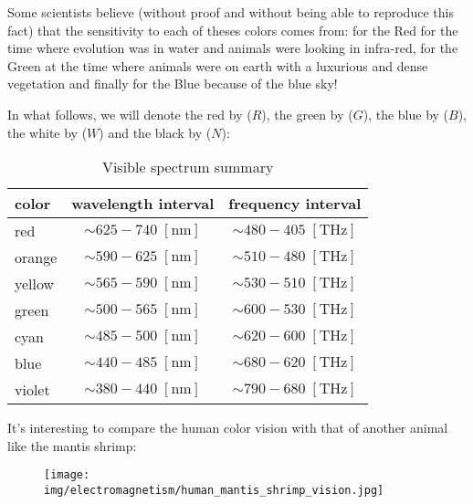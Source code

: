 	\begin{tcolorbox}[title=Remark,colframe=black,arc=10pt]
	Some scientists believe (without proof and without being able to reproduce this fact) that the sensitivity to each of theses colors comes from: for the Red for the time where evolution was in water and animals were looking in infra-red, for the Green at the time where animals were on earth with a luxurious and dense vegetation and finally for the Blue because of the blue sky!
	\end{tcolorbox}	
	In what follows, we will denote the red by ($R$), the green by ($G$), the blue by ($B$), the white by ($W$) and the black by ($N$):
	\begin{table}[H]
		\centering
		\begin{tabular}{|l|c|c|}
		\hline
		\rowcolor[HTML]{C0C0C0} 
		\textbf{color} & \textbf{wavelength interval} & \textbf{frequency interval} \\ \hline
		red & \cellcolor[HTML]{FE0000}$\sim 625-740\;[\text{nm}]$ & \cellcolor[HTML]{FE0000}$\sim 480-405\;[\text{THz}]$ \\ \hline
		orange & \cellcolor[HTML]{F8A102}$\sim 590-625\;[\text{nm}]$ & \cellcolor[HTML]{F8A102}$\sim 510-480\;[\text{THz}]$ \\ \hline
		yellow & \cellcolor[HTML]{F8FF00}$\sim 565-590\;[\text{nm}]$ & \cellcolor[HTML]{F8FF00}$\sim 530-510\;[\text{THz}]$ \\ \hline
		green & \cellcolor[HTML]{34FF34}$\sim 500-565\;[\text{nm}]$ & \cellcolor[HTML]{34FF34}$\sim 600-530\;[\text{THz}]$ \\ \hline
		cyan & \cellcolor[HTML]{00D2CB}$\sim 485-500\;[\text{nm}]$ & \cellcolor[HTML]{00D2CB}$\sim 620-600\;[\text{THz}]$ \\ \hline
		blue & \cellcolor[HTML]{3166FF}$\sim 440-485\;[\text{nm}]$ & \cellcolor[HTML]{3166FF}$\sim 680-620\;[\text{THz}]$ \\ \hline
		violet & \cellcolor[HTML]{6200C9}$\sim 380-440\;[\text{nm}]$ & \cellcolor[HTML]{6200C9}$\sim 790-680\;[\text{THz}]$ \\ \hline
		\end{tabular}
		\caption{Visible spectrum summary}
	\end{table}
	It's interesting to compare the human color vision with that of another animal like the mantis shrimp:
	\begin{figure}[H]
		\centering
		\texttt{[image: img/electromagnetism/human\_mantis\_shrimp\_vision.jpg]}
	\end{figure}
	
